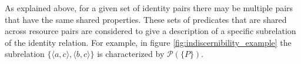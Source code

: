 \documentclass[letterpaper]{article}
\begin{document}
As explained above, for a given set of identity pairs there may be multiple pairs that have the same shared properties. These sets of predicates that are shared across resource pairs are considered to give a description of a specific subrelation of the identity relation. For example, in figure \ref{fig:indiscernibility_example} the subrelation $\{ \langle a, c \rangle, \langle b, c \rangle \}$ is characterized by $\mathcal{P}(\{ P \})$.

\end{document}
